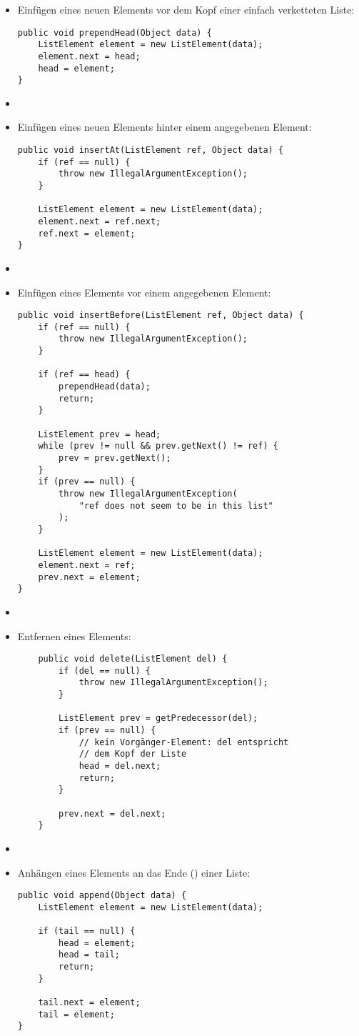 \begin{itemize}
    \item Einfügen eines neuen Elements vor dem Kopf einer einfach verketteten Liste:
\begin{verbatim}
public void prependHead(Object data) {
    ListElement element = new ListElement(data);
    element.next = head;
    head = element;
}
\end{verbatim}
    \item[]
    \item Einfügen eines neuen Elements hinter einem angegebenen Element:
\begin{verbatim}
public void insertAt(ListElement ref, Object data) {
    if (ref == null) {
        throw new IllegalArgumentException();
    }

    ListElement element = new ListElement(data);
    element.next = ref.next;
    ref.next = element;
}
\end{verbatim}
    \item[]
    \item Einfügen eines Elements vor einem angegebenen Element:
\begin{verbatim}
public void insertBefore(ListElement ref, Object data) {
    if (ref == null) {
        throw new IllegalArgumentException();
    }

    if (ref == head) {
        prependHead(data);
        return;
    }

    ListElement prev = head;
    while (prev != null && prev.getNext() != ref) {
        prev = prev.getNext();
    }
    if (prev == null) {
        throw new IllegalArgumentException(
            "ref does not seem to be in this list"
        );
    }

    ListElement element = new ListElement(data);
    element.next = ref;
    prev.next = element;
}
\end{verbatim}
    \item[]
    \item Entfernen eines Elements:
    \begin{verbatim}
    public void delete(ListElement del) {
        if (del == null) {
            throw new IllegalArgumentException();
        }

        ListElement prev = getPredecessor(del);
        if (prev == null) {
            // kein Vorgänger-Element: del entspricht
            // dem Kopf der Liste
            head = del.next;
            return;
        }

        prev.next = del.next;
    }
    \end{verbatim}
    \item[]
    \item Anhängen eines Elements an das Ende () einer Liste:
\begin{verbatim}
public void append(Object data) {
    ListElement element = new ListElement(data);

    if (tail == null) {
        head = element;
        head = tail;
        return;
    }

    tail.next = element;
    tail = element;
}
\end{verbatim}
\end{itemize}